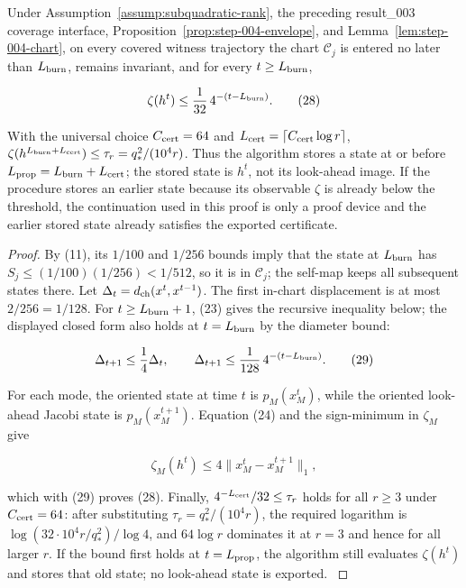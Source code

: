 \begin{proposition}\label{prop:step-004-certificate}
Under
Assumption~\ref{assump:subquadratic-rank}, the preceding result\_003 coverage
interface, Proposition~\ref{prop:step-004-envelope}, and
Lemma~\ref{lem:step-004-chart},
on every covered witness trajectory the chart \(\mathcal C_j\) is entered no
later than \(L_{\rm burn}\), remains invariant, and for every
\(t\ge L_{\rm burn}\),

\[
\zeta(h^t)\le {1\over32}\,4^{-(t-L_{\rm burn})}.
\tag{28}
\]

With the universal choice \(C_{\rm cert}=64\) and
\(L_{\rm cert}=\lceil C_{\rm cert}\log r\rceil\),
\(\zeta(h^{L_{\rm burn}+L_{\rm cert}})\le\tau_r=q_*^2/(10^4r)\). Thus the
algorithm stores a state at or before \(L_{\rm prop}=L_{\rm burn}+L_{\rm cert}\);
the stored state is \(h^t\), not its look-ahead image. If the procedure stores
an earlier state because its observable \(\zeta\) is already below the
threshold, the continuation used in this proof is only a proof device and
the earlier stored state already satisfies the exported certificate.

\begin{proof}
By (11), its \(1/100\) and \(1/256\) bounds imply
that the state at \(L_{\rm burn}\) has
\(S_j\le(1/100)(1/256)<1/512\), so it is in \(\mathcal C_j\); the self-map
keeps all subsequent states there. Let
\(\Delta_t=d_{\rm ch}(x^t,x^{t-1})\). The first in-chart displacement is at
most \(2/256=1/128\). For \(t\ge L_{\rm burn}+1\), (23) gives the recursive
inequality below; the displayed closed form also holds at
\(t=L_{\rm burn}\) by the diameter bound:

\[
\Delta_{t+1}\le {1\over4}\Delta_t,\qquad
\Delta_{t+1}\le {1\over128}\,4^{-(t-L_{\rm burn})}.
\tag{29}
\]

For each mode, the oriented state at time \(t\) is \(p_M(x_M^t)\), while the
oriented look-ahead Jacobi state is \(p_M(x_M^{t+1})\). Equation (24) and the
sign-minimum in \(\zeta_M\) give

\[
\zeta_M(h^t)\le4\|x_M^t-x_M^{t+1}\|_1,
\]

which with (29) proves (28). Finally,
\(4^{-L_{\rm cert}}/32\le\tau_r\) holds for all \(r\ge3\) under \(C_{\rm cert}=64\):
after substituting \(\tau_r=q_*^2/(10^4r)\), the required logarithm is
\(\log(32\cdot10^4r/q_*^2)/\log4\), and \(64\log r\) dominates it at \(r=3\)
and hence for all larger \(r\). If the bound first holds at \(t=L_{\rm prop}\),
the algorithm still evaluates \(\zeta(h^t)\) and stores that old state; no
look-ahead state is exported. \(\)

\end{proof}
\end{proposition}
